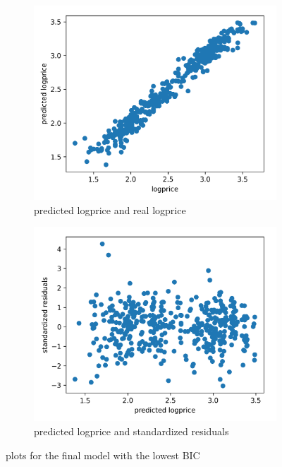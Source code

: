 \documentclass[12 pt]{scrartcl}
\begin{document}
\begin{figure}[htb]
  \centering
  \begin{subfigure}[b]{0.48\textwidth}
    \centering
    \includegraphics[width=\textwidth]{./images/finalmodel1.png}
    \caption{predicted logprice and real logprice}
    \label{fig:finalmodel1}
  \end{subfigure}
  \begin{subfigure}[b]{0.48\textwidth}
    \centering
    \includegraphics[width=\textwidth]{./images/finalmodel2.png}
    \caption{predicted logprice and standardized residuals}
    \label{fig:finalmodel2}
  \end{subfigure}
  \caption{plots for the final model with the lowest BIC}
  \label{fig:modelfit}
\end{figure}
\end{document}
